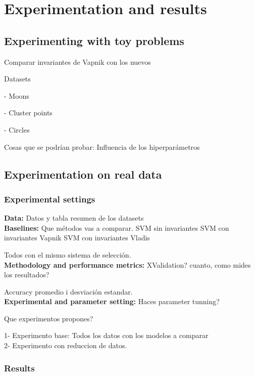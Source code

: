 
\chapter{Experimentation and results} %
\label{Chapter4}

\label{ChapterX} %

\section{Experimenting with toy problems}

Comparar invariantes de Vapnik con los nuevos

Datasets

- Moons

- Cluster points

- Circles


Cosas que se podrían probar: Influencia de los hiperparámetros


\section{Experimentation on real data}
\subsection{Experimental settings}
{\bf Data:} Datos y tabla resumen de los datasets\\
{\bf Baselines:} Que métodos vas a comparar.
SVM sin invariantes
SVM con invariantes Vapnik
SVM con invariantes Vladis

Todos con el mismo sistema de selección.
\\
{\bf Methodology and performance metrics:} XValidation? cuanto, como mides los resultados?

Accuracy promedio i desviación estandar.
\\
{\bf Experimental and parameter setting:}
Haces parameter tunning?

Que experimentos propones?

1- Experimento base: Todos los datos con los modelos a comparar\\
2- Experimento con reduccion de datos.


\subsection{Results}
